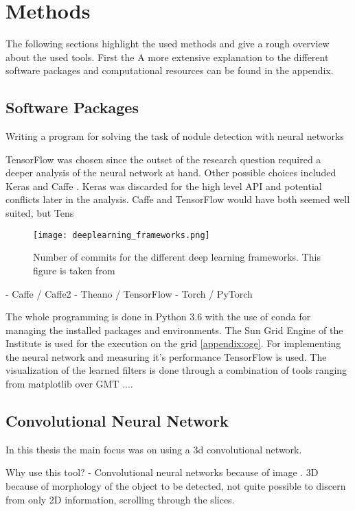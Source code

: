 \documentclass[main.tex]{subfiles}
\begin{document}
\chapter{Methods}\label{chap:methods}
The following sections highlight the used methods and give a rough overview about the used tools. First the   A more extensive explanation to the different software packages and computational resources can be found in the appendix.

\section{Software Packages}
Writing a program for solving the task of nodule detection with neural networks 

TensorFlow was chosen since the outset of the research question required a deeper analysis of the neural network at hand. Other possible choices included Keras and Caffe . Keras was discarded for the high level API and potential conflicts later in the analysis. Caffe and TensorFlow would have both seemed well suited, but Tens


\begin{figure}
\begin{center}
\texttt{[image: deeplearning\_frameworks.png]}
\end{center}
\caption{Number of commits for the different deep learning frameworks. This figure is taken from \cite{shapiro2017}}
\label{fig:frameworks}
\end{figure}



- Caffe / Caffe2
- Theano / TensorFlow
- Torch / PyTorch


The whole programming is done in Python 3.6 with the use of conda for managing the installed packages and environments. The Sun Grid Engine of the Institute is used for the execution on the grid \ref{appendix:oge}. For implementing the neural network and measuring it's performance TensorFlow is used. The visualization of the learned filters is done through a combination of tools ranging from matplotlib over GMT ....

\section{Convolutional Neural Network}
In this thesis the main focus was on using a 3d convolutional network. 

Why use this tool? - Convolutional neural networks because of image . 3D because of morphology of the object to be detected, not quite possible to discern from only 2D information, scrolling through the slices.
\end{document}
